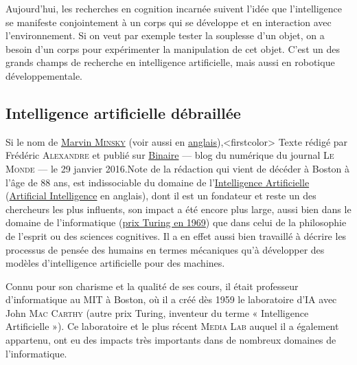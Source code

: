 Aujourd'hui, les recherches en cognition incarnée suivent l'idée que l'intelligence se manifeste conjointement à un corps qui se développe et en interaction avec l'environnement. Si on veut par exemple tester la souplesse d'un objet, on a besoin d'un corps pour expérimenter la manipulation de cet objet. C'est un des grands champs de recherche en intelligence artificielle, mais aussi en robotique développementale.




\subsection[Intelligence artificielle débraillée]{Intelligence artificielle débraillée}
\label{sub:III.1.2}

Si le nom de \href{https://fr.wikipedia.org/wiki/Marvin_Minsky}{Marvin \textsc{Minsky}} (voir aussi en \href{https://en.wikipedia.org/wiki/Marvin_Minsky}{anglais}),\caution[t]<firstcolor>{%
\upshape Texte rédigé par Frédéric \textsc{Alexandre} et publié sur \href{https://www.lemonde.fr/blog/binaire/2016/01/29/lintelligence-artificielle-debraillee/}{Binaire} --- blog du numérique du journal \textsc{Le Monde} --- le 29 janvier 2016.}{\upshape Note de la rédaction}
 qui vient de décéder à Boston à l’âge de 88 ans, est indissociable du domaine de l’\href{https://fr.wikipedia.org/wiki/Intelligence_artificielle}{Intelligence Artificielle} (\href{https://en.wikipedia.org/wiki/Artificial_intelligence}{Artificial Intelligence} en anglais), dont il est un fondateur et reste un des chercheurs les plus influents, son impact a été encore plus large, aussi bien dans le domaine de l’informatique (\href{https://fr.wikipedia.org/wiki/Prix_Turing}{prix Turing en 1969}) que dans celui de la philosophie de l’esprit ou des sciences cognitives. Il a en effet aussi bien travaillé à décrire les processus de pensée des humains en termes mécaniques qu’à développer des modèles d’intelligence artificielle pour des machines.

Connu pour son charisme et la qualité de ses cours, il était professeur d’informatique au MIT à Boston, où il a créé dès 1959 le laboratoire d’IA avec John \textsc{Mac Carthy} (autre prix Turing, inventeur du terme « Intelligence Artificielle »). Ce laboratoire et le plus récent \textsc{Media Lab} auquel il a également appartenu, ont eu des impacts très importants dans de nombreux domaines de l’informatique.

